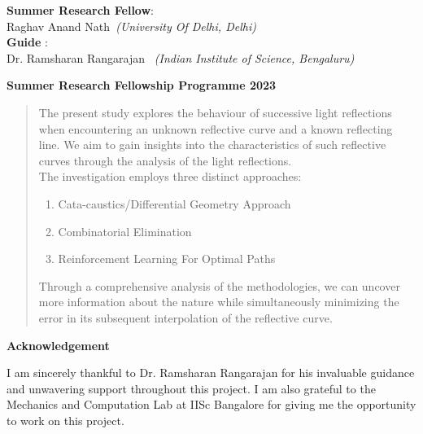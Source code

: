 \documentclass[12pt,a4paper,twoside]{report}
\begin{document}
\begin{titlepage}
\begin{center}
		\textbf{Summer Research Fellow}:\\ Raghav Anand Nath\textit{~(University Of Delhi, Delhi)} \vspace{0.3cm}\\ \textbf{Guide} : \\  Dr. Ramsharan Rangarajan \textit{~(Indian Institute of Science, Bengaluru)}
		
		
		\vspace{1.2cm} %
		\textbf{Summer Research Fellowship Programme 2023}\\	         
	\end{center}
\end{titlepage}

\begin{abstract}
	\vspace{1cm}
	The present study explores the behaviour of successive light reflections when encountering an unknown reflective curve and a known reflecting line. We aim to gain insights into the characteristics of such reflective curves through the analysis of the light reflections. \\
	
	The investigation employs three distinct approaches: 
	\begin{enumerate}
	\item Cata-caustics/Differential Geometry Approach
	\item	Combinatorial Elimination
	\item	Reinforcement Learning For Optimal Paths \\
	\end{enumerate} 

	
	Through a comprehensive analysis of the methodologies, we can uncover more information about the nature while simultaneously minimizing the error in its subsequent interpolation of the reflective curve.
	
	
\end{abstract}
\newpage
\pagestyle{empty}

\centering
\vspace{4cm}
\textbf{Acknowledgement}\\ \vspace{1.4cm}
\justifying

I am sincerely thankful to Dr. Ramsharan Rangarajan for his invaluable guidance and unwavering support throughout this project. I am also grateful to the Mechanics and Computation Lab at IISc Bangalore for giving me the opportunity to work on this project.
\end{document}
